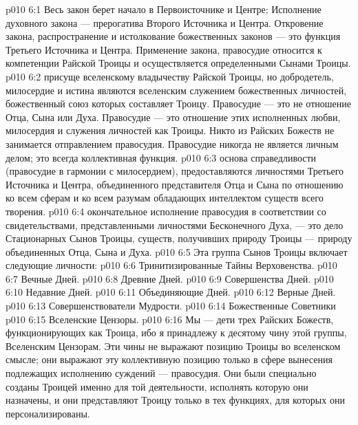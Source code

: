 \vs p010 6:1 Весь закон берет начало в Первоисточнике и Центре;  Исполнение духовного закона --- прерогатива Второго Источника и Центра. Откровение закона, распространение и истолкование божественных законов --- это функция Третьего Источника и Центра. Применение закона, правосудие относится к компетенции Райской Троицы и осуществляется определенными Сынами Троицы.
\vs p010 6:2 \pc {} присуще вселенскому владычеству Райской Троицы, но добродетель, милосердие и истина являются вселенским служением божественных личностей, божественный союз которых составляет Троицу. Правосудие --- это не отношение Отца, Сына или Духа. Правосудие --- это отношение этих исполненных любви, милосердия и служения личностей как Троицы. Никто из Райских Божеств не занимается отправлением правосудия. Правосудие никогда не является личным делом; это всегда коллективная функция.
\vs p010 6:3 \pc {} основа справедливости (правосудие в гармонии с милосердием), предоставляются личностями Третьего Источника и Центра, объединенного представителя Отца и Сына по отношению ко всем сферам и ко всем разумам обладающих интеллектом существ всего творения.
\vs p010 6:4 \pc {} окончательное исполнение правосудия в соответствии со свидетельствами, представленными личностями Бесконечного Духа, --- это дело Стационарных Сынов Троицы, существ, получивших природу Троицы --- природу объединенных Отца, Сына и Духа.
\vs p010 6:5 \pc Эта группа Сынов Троицы включает следующие личности:
\vs p010 6:6 \bibnobreakspace Тринитизированные Тайны Верховенства.
\vs p010 6:7 \bibnobreakspace Вечные Дней.
\vs p010 6:8 \bibnobreakspace Древние Дней.
\vs p010 6:9 \bibnobreakspace Совершенства Дней.
\vs p010 6:10 \bibnobreakspace Недавние Дней.
\vs p010 6:11 \bibnobreakspace Объединяющие Дней.
\vs p010 6:12 \bibnobreakspace Верные Дней.
\vs p010 6:13 \bibnobreakspace Совершенствователи Мудрости.
\vs p010 6:14 \bibnobreakspace Божественные Советники
\vs p010 6:15 \bibnobreakspace Вселенские Цензоры.
\vs p010 6:16 \pc Мы --- дети трех Райских Божеств, функционирующих как Троица, ибо я принадлежу к десятому чину этой группы, Вселенским Цензорам. Эти чины не выражают позицию Троицы во вселенском смысле; они выражают эту коллективную позицию только в сфере вынесения подлежащих исполнению суждений --- правосудия. Они были специально созданы Троицей именно для той деятельности, исполнять которую они назначены, и они представляют Троицу только в тех функциях, для которых они персонализированы.
